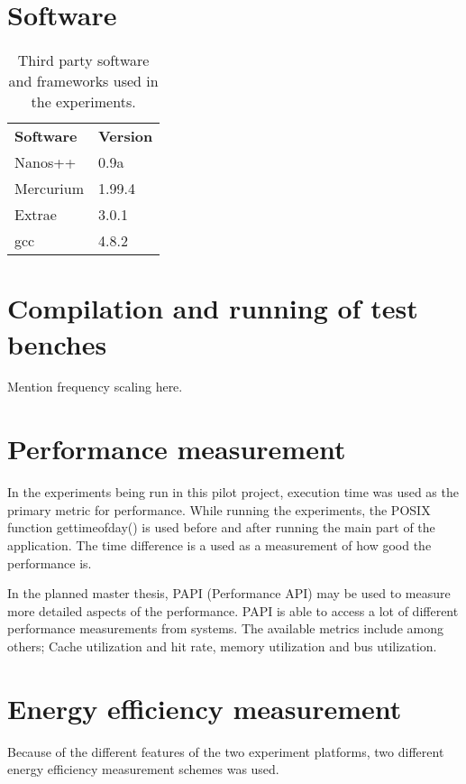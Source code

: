 
\section{Software}
\begin{table}[H]
  \begin{tabular}{ll}
    \textbf{Software} & \textbf{Version}  \\
    Nanos++           & 0.9a              \\
    Mercurium         & 1.99.4            \\
    Extrae            & 3.0.1             \\
    gcc               & 4.8.2             
  \end{tabular}
  \caption{Third party software and frameworks used in the experiments.\label{overflow}}
\end{table}


\section{Compilation and running of test benches}
Mention frequency scaling here.

\section{Performance measurement}
In the experiments being run in this pilot project, execution time was used as the primary metric for performance.
While running the experiments, the POSIX function gettimeofday() is used before and after running the main part of the application.
The time difference is a used as a measurement of how good the performance is.

In the planned master thesis, PAPI (Performance API) may be used to measure more detailed aspects of the performance.
PAPI is able to access a lot of different performance measurements from systems.
The available metrics include among others; Cache utilization and hit rate, memory utilization and bus utilization.

\section{Energy efficiency measurement}
Because of the different features of the two experiment platforms, two different energy efficiency measurement schemes was used.

